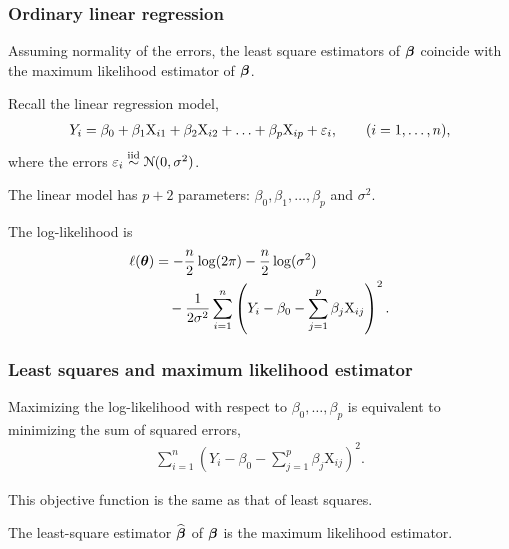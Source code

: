 \documentclass{beamer}
\begin{document}
\begin{frame}
\frametitle{Ordinary linear regression}
Assuming normality of the errors,  the least square estimators of $\boldsymbol {\beta}$ coincide with the maximum likelihood estimator of $\boldsymbol {\beta}$.
\bi \item 
Recall the linear regression model, 
\begin{align*}
Y_i=\beta_0+\beta_1 \mathrm{X}_{i1}+\beta_2 \mathrm{X}_{i2}+\ldots +\beta_p \mathrm{X}_{ip} + \varepsilon_i, \qquad  (i=1, \ldots, n),
\end{align*}
where the errors $ \varepsilon_i\stackrel{\textnormal{iid}}{\sim} \mathcal{N}(0, \sigma^2)$.
\item The linear model has $p+2$ parameters: $\beta_0, \beta_1, \ldots, \beta_p $ and $ \sigma^2$. 
\item The log-likelihood is 
\begin{align*}
\ell(\boldsymbol {\theta})&=-\frac{n}{2} \log(2\pi)-\frac{n}{2} \log (\sigma^2)\\& \quad -\frac{1}{2\sigma^2}\sum_{i=1}^n \left(Y_i-\beta_0-\sum_{j=1}^p \beta_j\mathrm{X}_{ij}\right)^2.
\end{align*}
\ei
\end{frame}


\begin{frame}
 \frametitle{Least squares and maximum likelihood estimator}
\bi
\item Maximizing the log-likelihood with respect to $\beta_0, \ldots, \beta_p$ is equivalent to
minimizing the sum of squared errors,
\begin{align*}
\sum_{i=1}^n \left(Y_i-\beta_0-\sum_{j=1}^p \beta_j\mathrm{X}_{ij}\right)^2.
\end{align*}
\item This objective function is the same as that of least squares.
\item The least-square estimator $\widehat{\boldsymbol {\beta}}$ of $\boldsymbol {\beta}$ is the maximum likelihood estimator.
\ei
\end{frame}
\end{document}
